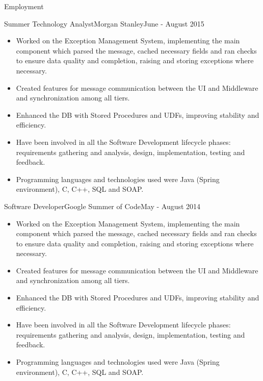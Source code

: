 \documentclass[]{cv}
\begin{document}
\begin{cvsection}{Employment}
		\begin{cvsubsection}{Summer Technology Analyst}{Morgan Stanley}{June - August 2015}
			\begin{itemize}
				\item Worked on the Exception Management System, implementing the main component which parsed the message, cached necessary fields and ran checks to ensure 
					data quality and completion, raising and storing exceptions where necessary.
				\item Created features for message communication between the UI and Middleware and synchronization among all tiers.	
				\item Enhanced the DB with Stored Procedures and UDFs, improving stability and efficiency.
				\item Have been involved in all the Software Development lifecycle phases: requirements gathering and analysis, design,
					implementation, testing and feedback.
				\item Programming languages and technologies used were Java (Spring environment), C, C++, SQL and SOAP.
			\end{itemize}
		\end{cvsubsection}

		\begin{cvsubsection}{Software Developer}{Google Summer of Code}{May - August 2014}
			\begin{itemize}
				\item Worked on the Exception Management System, implementing the main component which parsed the message, cached necessary fields and ran checks to ensure 
					data quality and completion, raising and storing exceptions where necessary.
				\item Created features for message communication between the UI and Middleware and synchronization among all tiers.	
				\item Enhanced the DB with Stored Procedures and UDFs, improving stability and efficiency.
				\item Have been involved in all the Software Development lifecycle phases: requirements gathering and analysis, design,
					implementation, testing and feedback.
				\item Programming languages and technologies used were Java (Spring environment), C, C++, SQL and SOAP.
			\end{itemize}
		\end{cvsubsection}

	\end{cvsection}
	
\end{document}
